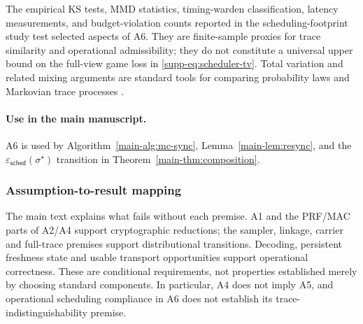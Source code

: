 \documentclass[journal]{IEEEtran}
\theoremstyle{definition}
\theoremstyle{game}
\begin{document}
The empirical KS tests, MMD statistics, timing-warden
classification, latency measurements, and budget-violation counts
reported in the scheduling-footprint study test selected aspects
of A6. They are finite-sample proxies for trace similarity and
operational admissibility; they do not constitute a universal
upper bound on the full-view game loss in
\eqref{supp-eq:scheduler-tv}. Total variation and related mixing
arguments are standard tools for comparing probability laws and
Markovian trace processes \cite{levin2017markov}.

\paragraph{Use in the main manuscript.}
A6 is used by Algorithm~\ref{main-alg:mc-sync},
Lemma~\ref{main-lem:resync}, and the
$\varepsilon_{\mathsf{sched}}(\sigma^{\star})$ transition in
Theorem~\ref{main-thm:composition}.

\subsubsection{Assumption-to-result mapping}
\label{supp-subsec:assumption_mapping}

The main text explains what fails without each premise. A1 and the PRF/MAC
parts of A2/A4 support cryptographic reductions; the sampler, linkage,
carrier and full-trace premises support distributional transitions.
Decoding, persistent freshness state and usable transport opportunities
support operational correctness. These are conditional requirements, not
properties established merely by choosing standard components. In
particular, A4 does not imply A5, and operational scheduling compliance in
A6 does not establish its trace-indistinguishability premise.
\end{document}

